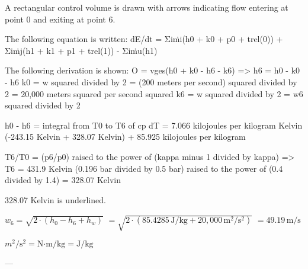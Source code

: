 A rectangular control volume is drawn with arrows indicating flow entering at point 0 and exiting at point 6.  

The following equation is written:  
dE/dt = Σiṁi(h0 + k0 + p0 + trel(0)) + Σiṁj(h1 + k1 + p1 + trel(1)) - Σiṁu(h1)  

The following derivation is shown:  
O = vges(h0 + k0 - h6 - k6) => h6 = h0 - k0 - h6  
k0 = w squared divided by 2 = (200 meters per second) squared divided by 2 = 20,000 meters squared per second squared  
k6 = w squared divided by 2 = w6 squared divided by 2  

h0 - h6 = integral from T0 to T6 of cp dT = 7.066 kilojoules per kilogram Kelvin (-243.15 Kelvin + 328.07 Kelvin) + 85.925 kilojoules per kilogram  

T6/T0 = (p6/p0) raised to the power of (kappa minus 1 divided by kappa)  
=> T6 = 431.9 Kelvin (0.196 bar divided by 0.5 bar) raised to the power of (0.4 divided by 1.4) = 328.07 Kelvin  

328.07 Kelvin is underlined.

\( w_6 = \sqrt{2 \cdot (h_0 - h_6 + h_w)} \)  
\( = \sqrt{2 \cdot (85.4285 \, \text{J/kg} + 20,000 \, \text{m}^2/\text{s}^2)} \)  
\( = 49.19 \, \text{m/s} \)  

\( m^2/\text{s}^2 = \text{N·m}/\text{kg} = \text{J}/\text{kg} \)  

---